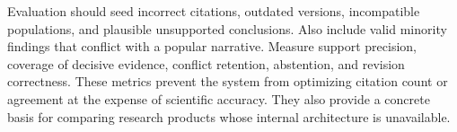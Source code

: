 Evaluation should seed incorrect citations, outdated versions, incompatible populations, and plausible unsupported conclusions. Also include valid minority findings that conflict with a popular narrative. Measure support precision, coverage of decisive evidence, conflict retention, abstention, and revision correctness. These metrics prevent the system from optimizing citation count or agreement at the expense of scientific accuracy. They also provide a concrete basis for comparing research products whose internal architecture is unavailable.
